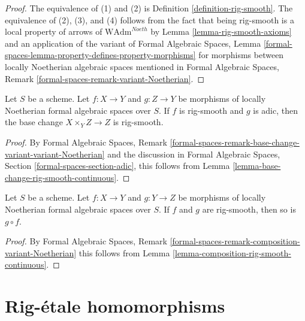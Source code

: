 \begin{proof}
The equivalence of (1) and (2) is Definition \ref{definition-rig-smooth}.
The equivalence of (2), (3), and (4) follows from the fact that
being rig-smooth is a local property of arrows of
$\text{WAdm}^{Noeth}$ by Lemma \ref{lemma-rig-smooth-axioms}
and an application of the variant of
Formal Algebraic Spaces, Lemma
\ref{formal-spaces-lemma-property-defines-property-morphisms}
for morphisms between locally Noetherian algebraic spaces
mentioned in
Formal Algebraic Spaces, Remark
\ref{formal-spaces-remark-variant-Noetherian}.
\end{proof}

\begin{lemma}
\label{lemma-base-change-rig-smooth}
Let $S$ be a scheme. Let $f : X \to Y$ and $g : Z \to Y$
be morphisms of locally Noetherian formal algebraic spaces over $S$.
If $f$ is rig-smooth and $g$ is adic, then the base change
$X \times_Y Z \to Z$ is rig-smooth.
\end{lemma}

\begin{proof}
By Formal Algebraic Spaces, Remark
\ref{formal-spaces-remark-base-change-variant-variant-Noetherian}
and the discussion in Formal Algebraic Spaces, Section
\ref{formal-spaces-section-adic},
this follows from Lemma \ref{lemma-base-change-rig-smooth-continuous}.
\end{proof}

\begin{lemma}
\label{lemma-composition-rig-smooth}
Let $S$ be a scheme. Let $f : X \to Y$ and $g : Y \to Z$
be morphisms of locally Noetherian formal algebraic spaces over $S$.
If $f$ and $g$ are rig-smooth, then so is $g \circ f$.
\end{lemma}

\begin{proof}
By Formal Algebraic Spaces, Remark
\ref{formal-spaces-remark-composition-variant-Noetherian}
this follows from Lemma \ref{lemma-composition-rig-smooth-continuous}.
\end{proof}










\section{Rig-\'etale homomorphisms}
\label{section-rig-etale-homomorphisms}

